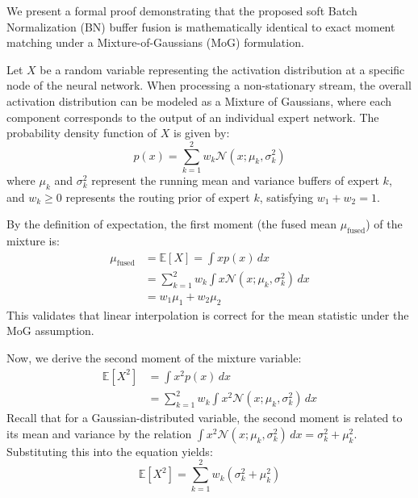 \documentclass{article}
\theoremstyle{plain}
\theoremstyle{definition}
\theoremstyle{remark}
\begin{document}
We present a formal proof demonstrating that the proposed soft Batch Normalization (BN) buffer fusion is mathematically identical to exact moment matching under a Mixture-of-Gaussians (MoG) formulation. 

Let $X$ be a random variable representing the activation distribution at a specific node of the neural network. When processing a non-stationary stream, the overall activation distribution can be modeled as a Mixture of Gaussians, where each component corresponds to the output of an individual expert network. The probability density function of $X$ is given by:
\begin{equation}
  p(x) = \sum_{k=1}^2 w_k \mathcal{N}(x; \mu_k, \sigma_k^2)
\end{equation}
where $\mu_k$ and $\sigma_k^2$ represent the running mean and variance buffers of expert $k$, and $w_k \ge 0$ represents the routing prior of expert $k$, satisfying $w_1 + w_2 = 1$.

By the definition of expectation, the first moment (the fused mean $\mu_{\mathrm{fused}}$) of the mixture is:
\begin{align}
  \mu_{\mathrm{fused}} &= \mathbb{E}[X] = \int x p(x) \, dx \nonumber \\
  &= \sum_{k=1}^2 w_k \int x \mathcal{N}(x; \mu_k, \sigma_k^2) \, dx \nonumber \\
  &= w_1 \mu_1 + w_2 \mu_2
\end{align}
This validates that linear interpolation is correct for the mean statistic under the MoG assumption.

Now, we derive the second moment of the mixture variable:
\begin{align}
  \mathbb{E}[X^2] &= \int x^2 p(x) \, dx \nonumber \\
  &= \sum_{k=1}^2 w_k \int x^2 \mathcal{N}(x; \mu_k, \sigma_k^2) \, dx
\end{align}
Recall that for a Gaussian-distributed variable, the second moment is related to its mean and variance by the relation $\int x^2 \mathcal{N}(x; \mu_k, \sigma_k^2) \, dx = \sigma_k^2 + \mu_k^2$. Substituting this into the equation yields:
\begin{equation}
  \mathbb{E}[X^2] = \sum_{k=1}^2 w_k \left( \sigma_k^2 + \mu_k^2 \right)
\end{equation}
\end{document}

